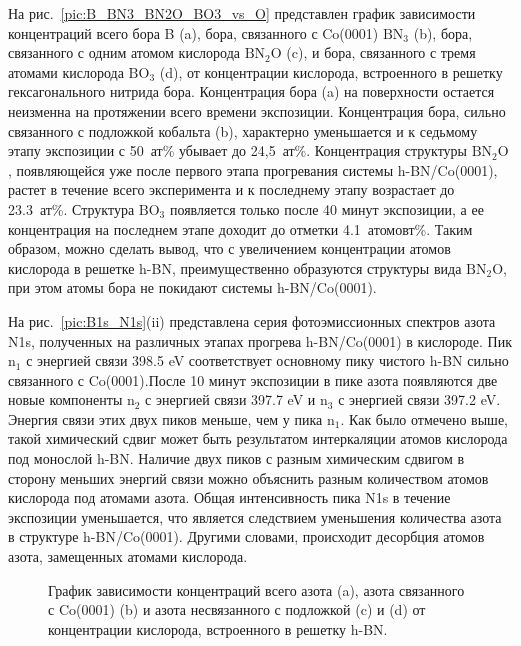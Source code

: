 На рис.~\ref{pic:B_BN3_BN2O_BO3_vs_O} представлен график зависимости концентраций всего бора B (a), бора, связанного с Co(0001)
$\mathrm{BN_3}$ (b), бора, связанного с одним атомом кислорода $\mathrm{BN_2O}$ (c), и бора, связанного с тремя атомами кислорода
$\mathrm{BO_3}$ (d), от концентрации кислорода, встроенного в решетку гексагонального нитрида бора. Концентрация бора (a) на поверхности
остается неизменна на протяжении всего времени экспозиции. Концентрация бора, сильно связанного с подложкой кобальта (b), характерно 
уменьшается и к седьмому этапу экспозиции с 50~ат\% убывает до 24,5~ат\%. Концентрация структуры $\mathrm{BN_2O}$, появляющейся уже после
первого этапа прогревания системы h-BN/Co(0001), растет в течение всего эксперимента и к последнему этапу возрастает до 23.3~ат\%. 
Структура $\mathrm{BO_3}$ появляется только после 40 минут экспозиции, а ее концентрация на последнем этапе доходит до отметки 4.1~атомовт\%. Таким образом, можно
сделать вывод, что с увеличением концентрации атомов кислорода в решетке h-BN, преимущественно образуются структуры вида
$\mathrm{BN_2O}$, при этом атомы бора не покидают системы h-BN/Co(0001).


На рис.~\ref{pic:B1s_N1s}(ii) представлена серия фотоэмиссионных спектров азота N1s, полученных на различных этапах прогрева h-BN/Co(0001) в кислороде.
Пик $\mathrm{n_1}$ с энергией связи 398.5 eV соответствует основному пику чистого h-BN сильно связанного с Co(0001).После 10 минут экспозиции в пике азота появляются две новые компоненты $\mathrm{n_2}$ с энергией связи 397.7 eV и $\mathrm{n_3}$ с энергией связи 397.2 eV. Энергия связи этих двух пиков меньше, чем у пика $\mathrm{n_1}$. Как было отмечено выше, такой химический сдвиг может быть результатом интеркаляции атомов кислорода под монослой h-BN. Наличие двух пиков с разным химическим сдвигом в сторону меньших энергий связи можно объяснить разным количеством  атомов кислорода под атомами азота. Общая интенсивность пика N1s в течение экспозиции уменьшается, что является следствием уменьшения количества азота в структуре h-BN/Co(0001). Другими словами, происходит десорбция атомов азота, замещенных атомами кислорода.
	\begin{figure}[!ht]
		\caption{График зависимости концентраций всего азота (a), азота связанного с Co(0001) (b) и азота несвязанного с подложкой (c) и (d) от концентрации кислорода, встроенного в решетку h-BN.}
		\label{pic:Nfree_Nco_Ntot_vs_O}
	\end{figure}


